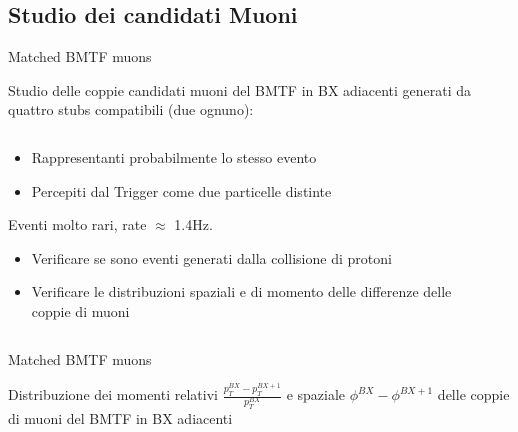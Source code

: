 \documentclass{beamer}
\begin{document}
\subsection{Studio dei candidati Muoni}

\begin{frame}{Matched BMTF muons}

Studio delle coppie candidati muoni del BMTF in BX adiacenti generati da quattro stubs compatibili (due ognuno):

\begin{columns}

    \begin{column}{0.55\textwidth}
    \begin{itemize}
        \item Rappresentanti probabilmente lo stesso evento
        \item Percepiti dal Trigger come due particelle distinte
    \end{itemize}

    Eventi molto rari, rate $\approx$ 1.4Hz.

    \begin{itemize}
        \item Verificare se sono eventi generati dalla collisione di protoni
        \item Verificare le distribuzioni spaziali e di momento delle differenze delle coppie di muoni
    \end{itemize}
        
    \end{column}
    \begin{column}{0.5\textwidth}
    \end{column}
\end{columns}
    
\end{frame}


\begin{frame}{Matched BMTF muons}

Distribuzione dei momenti relativi $\frac{p_T^{BX} - p_T^{BX+1}}{p_T^{BX}}$ e spaziale $\phi^{BX} - \phi^{BX+1}$ delle coppie di muoni del BMTF in BX adiacenti

\vspace{0.8cm}

\begin{columns}

    \begin{column}{0.5\textwidth}
    \end{column}
    \begin{column}{0.5\textwidth}
        
    \end{column}
\end{columns}
    
\end{frame}
\end{document}
